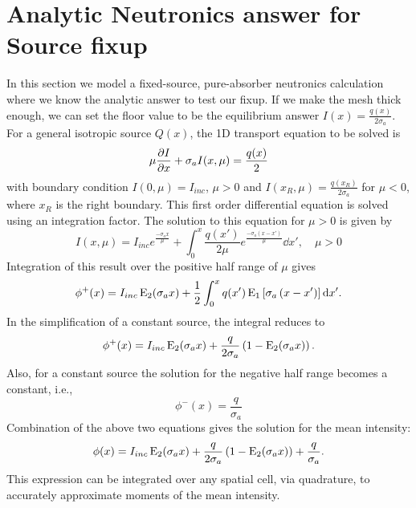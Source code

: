 \section{Analytic Neutronics answer for Source fixup}
\label{sec:analytic_neutronics}

In this section we model a fixed-source, pure-absorber neutronics calculation where we know the
analytic answer to test our fixup.  If we make the mesh thick enough, we can set the
floor value to be the equilibrium answer $I(x) = \frac{q(x)}{2\sigma_a}$. For a general
isotropic source $Q(x)$, the 1D transport equation to be solved is
\begin{equation}
    \mu \frac{\partial I}{\partial x} + \sigma_a I(x,\mu) = \frac{q(x)}{2}
\end{equation}
with boundary condition $I(0,\mu)=I_{inc}$, $\mu>0$ and
$I(x_R,\mu)=\frac{q(x_R)}{2\sigma_a}$ for
$\mu<0$, where $x_R$ is the right boundary.  
This first order differential equation is solved using an integration factor.
The solution to this equation for $\mu>0$ is given by
\begin{equation}
    I(x,\mu) = I_{inc}e^{\frac{-\sigma_a x}{\mu}} + \int_0^x \frac{q(x')}{2\mu}
    e^{\frac{-\sigma_a\left(x-x'\right)}{\mu}} \dd x',\quad \mu>0
\end{equation}
Integration of this result over the positive half range of $\mu$ gives
\begin{equation}
    \phi^+(x) = I_{inc}\operatorname{E}_{2}(\sigma_a x) + \frac{1}{2}\int_0^x q(x')\operatorname{E}_{1}\left[\sigma_a
    \left(x-x'\right)\right]
    \mathrm{d} x'.
\end{equation}
In the simplification of a constant source, the integral reduces to
\begin{equation}
    \phi^+(x) = I_{inc}\operatorname{E}_{2}(\sigma_a x) + \frac{q}{2\sigma_a} \left(1 -
    \operatorname{E}_{2}(\sigma_ax)\right).
\end{equation}
Also, for a constant source the solution for the negative half range becomes a constant, i.e.,
\begin{equation}
    \phi^{-}(x) = \frac{q}{\sigma_a}
\end{equation}
Combination of the above two equations gives the solution for the mean intensity:
\begin{equation}
    \phi(x) = I_{inc}\operatorname{E}_{2}(\sigma_a x) + \frac{q}{2\sigma_a} \left(1 -
    \operatorname{E}_{2}(\sigma_ax)\right) + \frac{q}{\sigma_a}.
\end{equation}
This expression can be integrated over any spatial cell, via quadrature, to accurately approximate moments of
the mean intensity.

